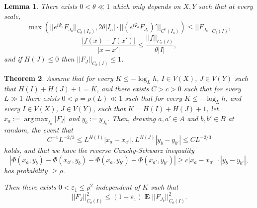 \documentclass[reqno,10pt]{amsart}
\DeclareMathOperator*{\Expect}{\mathbf E}
\DeclareMathOperator*{\argmax}{arg\,max}
\newtheorem{theorem}{Theorem}[section]
\newtheorem{lemma}[theorem]{Lemma}
\theoremstyle{definition}
\numberwithin{equation}{section}
\begin{document}
\begin{lemma}\label{theta assumptions}
There exists $0 < \theta \ll 1$ which only depends on $X, Y$ such that at every scale,
\begin{equation}\label{assumption on theta}
\max\left(||e^{i\Psi_b} F_{J_b}||_{C_\theta(I_a)}, 2\theta |I_a| \cdot ||(e^{i\Psi_b} F_{J_b})'||_{C^0(I_a)}\right) \leq ||F_{J_b}||_{C_\theta(I)},
\end{equation}
\begin{equation}\label{mean value theorem}
\frac{|f(x) - f(x')|}{|x - x'|} \leq \frac{||f||_{C_\theta(I)}}{\theta |I|},
\end{equation}
and if $H(J) \leq 0$ then $||F_J||_{C_\theta(I)} \leq 1$.
\end{lemma}

\begin{theorem}
Assume that for every $K \leq -\log_L h$, $I \in V(X)$, $J \in V(Y)$ such that $H(I) + H(J) + 1 = K$, and there exists $C > c > 0$ such that for every $L \gg 1$ there exists $0 < \rho = \rho(L) \ll 1$ such that for every $K \leq -\log_L h$, and every $I \in V(X)$, $J \in V(Y)$, such that $K = H(I) + H(J) + 1$, let $x_a := \argmax_{I_a} |F_J|$ and $y_b := y_{J_b}$. Then, drawing $a, a' \in A$ and $b, b' \in B$ at random, the event that
\begin{equation}\label{comparable lengths}
C^{-1} L^{-2/3} \leq L^{H(I)} |x_a - x_{a'}|, L^{H(J)} |y_b - y_{b'}| \leq C L^{-2/3}
\end{equation}
holds, and that we have the reverse Cauchy-Schwarz inequality
\begin{equation}\label{Reverse Cauchy Schwarz}
|\Phi(x_a, y_b) - \Phi(x_{a'}, y_b) - \Phi(x_a, y_{b'}) + \Phi(x_{a'}, y_{b'})| \geq c |x_a - x_{a'}| \cdot |y_b - y_{b'}|,
\end{equation}
has probability $\geq \rho$.

Then there exists $0 < \varepsilon_1 \leq \rho^2$ independent of $K$ such that
\begin{equation}\label{improved volume bound}
||F_J||_{C_\theta(I)}^2 \leq (1 - \varepsilon_1) \Expect ||F_{J_b}||_{C_\theta(I)}^2.
\end{equation}
\end{theorem}
\end{document}

